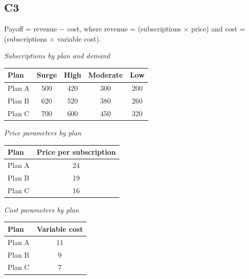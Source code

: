 \begin{ExamProblems}
			\subsection*{C3}
			Payoff = revenue $-$ cost, where revenue = (subscriptions $\times$ price) and cost = (subscriptions $\times$ variable cost).
			\begin{center}
				\textit{Subscriptions by plan and demand} \\
				\begin{tabular}{l c c c c}
					\toprule
					Plan & Surge & High & Moderate & Low \\
					\midrule
					Plan A & 500 & 420 & 300 & 200 \\
					Plan B & 620 & 520 & 380 & 260 \\
					Plan C & 700 & 600 & 450 & 320 \\
					\bottomrule
			\end{tabular}
			\end{center}
			\begin{center}
				\begin{minipage}[t]{0.48\linewidth}
					\textit{Price parameters by plan}
					\begin{center}
						\begin{tabular}{l c}
							\toprule
							Plan & Price per subscription \\
							\midrule
							Plan A & 24 \\
							Plan B & 19 \\
							Plan C & 16 \\
							\bottomrule
						\end{tabular}
					\end{center}
				\end{minipage}
				\hfill
				\begin{minipage}[t]{0.48\linewidth}
					\textit{Cost parameters by plan}
					\begin{center}
						\begin{tabular}{l c}
							\toprule
							Plan & Variable cost \\
							\midrule
							Plan A & 11 \\
							Plan B & 9 \\
							Plan C & 7 \\
							\bottomrule
						\end{tabular}
					\end{center}
				\end{minipage}
			\end{center}
			\begin{center}

\end{center}
\end{ExamProblems}
